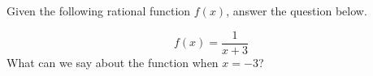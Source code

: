 \documentclass{ximera}
\author{David Kish}
\begin{document}
Given the following rational function $f(x)$, answer the question below.
\begin{exercise}
\[
f(x)=\frac{1}{x+3}
\]
What can we say about the function when $x=-3$?
\begin{multipleChoice}  
\end{multipleChoice}  
\end{exercise}
\end{document}
